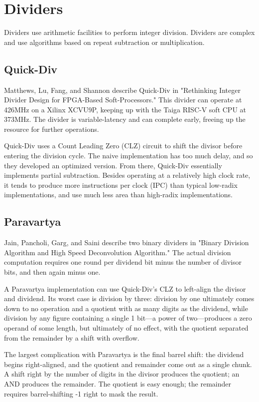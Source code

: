 \chapter{Dividers}
Dividers use arithmetic facilities to perform integer division.  Dividers are complex and use algorithms based on repeat subtraction or multiplication.

\section{Quick-Div}
Matthews, Lu, Fang, and Shannon describe Quick-Div in "Rethinking Integer Divider Design for FPGA-Based Soft-Processors."  This divider can operate at 426MHz on a Xilinx XCVU9P, keeping up with the Taiga RISC-V soft CPU at 373MHz.  The divider is variable-latency and can complete early, freeing up the resource for further operations.

Quick-Div uses a Count Leading Zero (CLZ) circuit to shift the divisor before entering the division cycle.  The naive implementation has too much delay, and so they developed an optimized version.  From there, Quick-Div essentially implements partial subtraction.  Besides operating at a relatively high clock rate, it tends to produce more instructions per clock (IPC) than typical low-radix implementations, and use much less area than high-radix implementations.

\section{Paravartya}

Jain, Pancholi, Garg, and Saini describe two binary dividers in "Binary Division Algorithm and High Speed Deconvolution Algorithm." The actual division computation requires one round per dividend bit minus the number of divisor bits, and then again minus one.

A Paravartya implementation can use Quick-Div's CLZ to left-align the divisor and dividend.  Its worst case is division by three:  division by one ultimately comes down to no operation and a quotient with as many digits as the dividend, while division by any figure containing a single 1 bit—a power of two—produces a zero operand of some length, but ultimately of no effect, with the quotient separated from the remainder by a shift with overflow.

The largest complication with Paravartya is the final barrel shift:  the dividend begins right-aligned, and the quotient and remainder come out as a single chunk.  A shift right by the number of digits in the divisor produces the quotient; an AND produces the remainder.  The quotient is easy enough; the remainder requires barrel-shifting -1 right to mask the result.